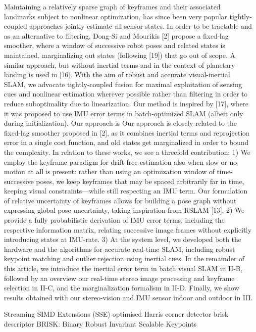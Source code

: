 \documentclass[12pt,twoside]{article}
\begin{document}
Maintaining a relatively sparse graph of
keyframes and their associated landmarks subject to nonlinear
optimization, has since been very popular
tightly-coupled approaches jointly estimate all sensor states.
In order to be tractable and as an alternative to filtering,
Dong-Si and Mourikis [2] propose a fixed-lag smoother,
where a window of successive robot poses and related states
is maintained, marginalizing out states (following [19]) that
go out of scope. A similar approach, but without inertial
terms and in the context of planetary landing is used in [16].
With the aim of robust and accurate visual-inertial SLAM,
we advocate tightly-coupled fusion for maximal exploitation
of sensing cues and nonlinear estimation wherever possible
rather than filtering in order to reduce suboptimality due
to linearization. Our method is inspired by [17], where it
was proposed to use IMU error terms in batch-optimized
SLAM (albeit only during initialization). Our approach is
Our approach is
closely related to the fixed-lag smoother proposed in [2], as
it combines inertial terms and reprojection error in a single
cost function, and old states get marginalized in order to
bound the complexity.
In relation to these works, we see a threefold contribution:
1) We employ the keyframe paradigm for drift-free estimation
also when slow or no motion at all is
present: rather than using an optimization window
of time-successive poses, we keep keyframes that
may be spaced arbitrarily far in time, keeping visual
constraints—while still respecting an IMU term. Our
formulation of relative uncertainty of keyframes allows
for building a pose graph without expressing global
pose uncertainty, taking inspiration from RSLAM [13].
2) We provide a fully probabilistic derivation of IMU error
terms, including the respective information matrix,
relating successive image frames without explicitly
introducing states at IMU-rate.
3) At the system level, we developed both the hardware
and the algorithms for accurate real-time SLAM, including
robust keypoint matching and outlier rejection
using inertial cues.
In the remainder of this article, we introduce the inertial
error term in batch visual SLAM in II-B, followed by
an overview our real-time stereo image processing and
keyframe selection in II-C, and the marginalization formalism
in II-D. Finally, we show results obtained with our
stereo-vision and IMU sensor indoor and outdoor in III.

Streaming SIMD Extensions (SSE) optimised
Harris corner detector
brisk descriptor
BRISK: Binary Robust Invariant Scalable Keypoints
\end{document}
